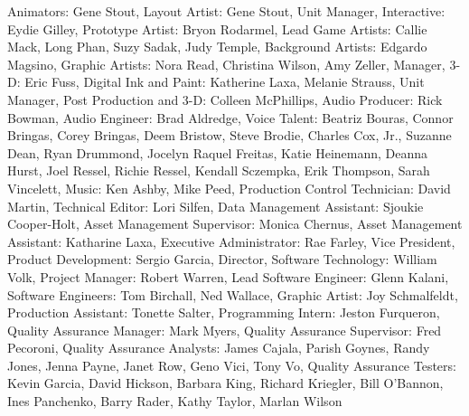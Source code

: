 Animators: Gene Stout,
Layout Artist: Gene Stout,
Unit Manager, Interactive: Eydie Gilley,
Prototype Artist: Bryon Rodarmel,
Lead Game Artists: Callie Mack, Long Phan, Suzy Sadak, Judy Temple,
Background Artists: Edgardo Magsino,
Graphic Artists: Nora Read, Christina Wilson, Amy Zeller,
Manager, 3-D: Eric Fuss,
Digital Ink and Paint: Katherine Laxa, Melanie Strauss,
Unit Manager, Post Production and 3-D: Colleen McPhillips,
Audio Producer: Rick Bowman,
Audio Engineer: Brad Aldredge,
Voice Talent: Beatriz Bouras, Connor Bringas, Corey Bringas, Deem Bristow, Steve Brodie, Charles Cox, Jr., Suzanne Dean, Ryan Drummond, Jocelyn Raquel Freitas, Katie Heinemann, Deanna Hurst, Joel Ressel, Richie Ressel, Kendall Sczempka, Erik Thompson, Sarah Vincelett,
Music: Ken Ashby, Mike Peed,
Production Control Technician: David Martin,
Technical Editor: Lori Silfen,
Data Management Assistant: Sjoukie Cooper-Holt,
Asset Management Supervisor: Monica Chernus,
Asset Management Assistant: Katharine Laxa,
Executive Administrator: Rae Farley,
Vice President, Product Development: Sergio Garcia,
Director, Software Technology: William Volk,
Project Manager: Robert Warren,
Lead Software Engineer: Glenn Kalani,
Software Engineers: Tom Birchall, Ned Wallace,
Graphic Artist: Joy Schmalfeldt,
Production Assistant: Tonette Salter,
Programming Intern: Jeston Furqueron,
Quality Assurance Manager: Mark Myers,
Quality Assurance Supervisor: Fred Pecoroni,
Quality Assurance Analysts: James Cajala, Parish Goynes, Randy Jones, Jenna Payne, Janet Row, Geno Vici, Tony Vo,
Quality Assurance Testers: Kevin Garcia, David Hickson, Barbara King, Richard Kriegler, Bill O'Bannon, Ines Panchenko, Barry Rader, Kathy Taylor, Marlan Wilson